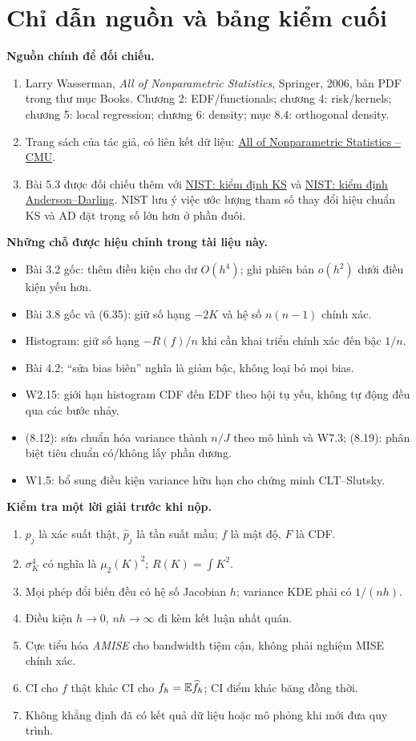 \documentclass[11pt,a4paper]{article}
\newcommand{\E}{\mathbb E}\newcommand{\Pp}{\mathbb P}
\begin{document}
\section{Chỉ dẫn nguồn và bảng kiểm cuối}
\textbf{Nguồn chính để đối chiếu.}
\begin{enumerate}
\item Larry Wasserman, \emph{All of Nonparametric Statistics}, Springer, 2006, bản PDF trong thư mục Books. Chương 2: EDF/functionals; chương 4: risk/kernels; chương 5: local regression; chương 6: density; mục 8.4: orthogonal density.
\item Trang sách của tác giả, có liên kết dữ liệu: \href{https://stat.cmu.edu/~larry/all-of-nonpar/index.html}{All of Nonparametric Statistics -- CMU}.
\item Bài 5.3 được đối chiếu thêm với \href{https://itl.nist.gov/div898/software/dataplot/refman1/auxillar/kstest.htm}{NIST: kiểm định KS} và \href{https://itl.nist.gov/div898/handbook/eda/section3/eda3e.htm}{NIST: kiểm định Anderson--Darling}. NIST lưu ý việc ước lượng tham số thay đổi hiệu chuẩn KS và AD đặt trọng số lớn hơn ở phần đuôi.
\end{enumerate}

\textbf{Những chỗ được hiệu chỉnh trong tài liệu này.}
\begin{itemize}
\item Bài 3.2 gốc: thêm điều kiện cho dư $O(h^4)$; ghi phiên bản $o(h^2)$ dưới điều kiện yếu hơn.
\item Bài 3.8 gốc và (6.35): giữ số hạng $-2K$ và hệ số $n(n-1)$ chính xác.
\item Histogram: giữ số hạng $-R(f)/n$ khi cần khai triển chính xác đến bậc $1/n$.
\item Bài 4.2: ``sửa bias biên'' nghĩa là giảm bậc, không loại bỏ mọi bias.
\item W2.15: giới hạn histogram CDF đến EDF theo hội tụ yếu, không tự động đều qua các bước nhảy.
\item (8.12): sửa chuẩn hóa variance thành $n/J$ theo mô hình và W7.3; (8.19): phân biệt tiêu chuẩn có/không lấy phần dương.
\item W1.5: bổ sung điều kiện variance hữu hạn cho chứng minh CLT--Slutsky.
\end{itemize}

\textbf{Kiểm tra một lời giải trước khi nộp.}
\begin{enumerate}
\item $p_j$ là xác suất thật, $\widehat p_j$ là tần suất mẫu; $f$ là mật độ, $F$ là CDF.
\item $\sigma_K^4$ có nghĩa là $\mu_2(K)^2$; $R(K)=\int K^2$.
\item Mọi phép đổi biến đều có hệ số Jacobian $h$; variance KDE phải có $1/(nh)$.
\item Điều kiện $h\to0$, $nh\to\infty$ đi kèm kết luận nhất quán.
\item Cực tiểu hóa \emph{AMISE} cho bandwidth tiệm cận, không phải nghiệm MISE chính xác.
\item CI cho $f$ thật khác CI cho $f_h=\E\fh$; CI điểm khác băng đồng thời.
\item Không khẳng định đã có kết quả dữ liệu hoặc mô phỏng khi mới đưa quy trình.
\end{enumerate}
\end{document}
